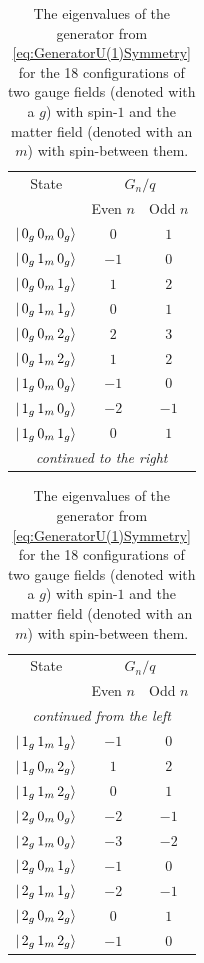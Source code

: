 \documentclass[../main.tex]{subfiles} %
\begin{document}
\begin{table}[t]
    \centering
    \begin{tabular}{|c|c|c|}
        \hline
        State & \multicolumn{2}{c|}{$G_n / q$} \\
         & Even $n$ & Odd $n$ \\ \hline
        $\ket{\, 0_g\, 0_m\, 0_g}$ & $0$ & $1$ \\ \hline
        $\ket{\, 0_g\, 1_m\, 0_g}$ & $-1$ & $0$ \\ \hline
        $\ket{\, 0_g\, 0_m\, 1_g}$ & $1$ & $2$ \\ \hline
        $\ket{\, 0_g\, 1_m\, 1_g}$ & $0$ & $1$ \\ \hline
        $\ket{\, 0_g\, 0_m\, 2_g}$ & $2$ & $3$ \\ \hline
        $\ket{\, 0_g\, 1_m\, 2_g}$ & $1$ & $2$ \\ \hline
        $\ket{\, 1_g\, 0_m\, 0_g}$ & $-1$ & $0$ \\ \hline
        $\ket{\, 1_g\, 1_m\, 0_g}$ & $-2$ & $-1$ \\ \hline
        $\ket{\, 1_g\, 0_m\, 1_g}$ & $0$ & $1$ \\ \hline
        \multicolumn{3}{|c|}{\textsl{continued to the right}} \\ \hline
    \end{tabular}
    \hfill
    \begin{tabular}{|c|c|c|}
        \hline
        State & \multicolumn{2}{c|}{$G_n / q$} \\
         & Even $n$ & Odd $n$ \\ \hline
        \multicolumn{3}{|c|}{\textsl{continued from the left}} \\ \hline
        $\ket{\, 1_g\, 1_m\, 1_g}$ & $-1$ & $0$ \\ \hline
        $\ket{\, 1_g\, 0_m\, 2_g}$ & $1$ & $2$ \\ \hline
        $\ket{\, 1_g\, 1_m\, 2_g}$ & $0$ & $1$ \\ \hline
        $\ket{\, 2_g\, 0_m\, 0_g}$ & $-2$ & $-1$ \\ \hline
        $\ket{\, 2_g\, 1_m\, 0_g}$ & $-3$ & $-2$ \\ \hline
        $\ket{\, 2_g\, 0_m\, 1_g}$ & $-1$ & $0$ \\ \hline
        $\ket{\, 2_g\, 1_m\, 1_g}$ & $-2$ & $-1$ \\ \hline
        $\ket{\, 2_g\, 0_m\, 2_g}$ & $0$ & $1$ \\ \hline
        $\ket{\, 2_g\, 1_m\, 2_g}$ & $-1$ & $0$ \\ \hline
    \end{tabular}
    \caption{The eigenvalues of the generator from \cref{eq:GeneratorU(1)Symmetry} for the 18 configurations of two gauge fields (denoted with a $g$) with spin-$1$ and the matter field (denoted with an $m$) with spin-\half between them.}
    \label{tab:EigenvaluesOfGenerator}
\end{table}
\end{document}
